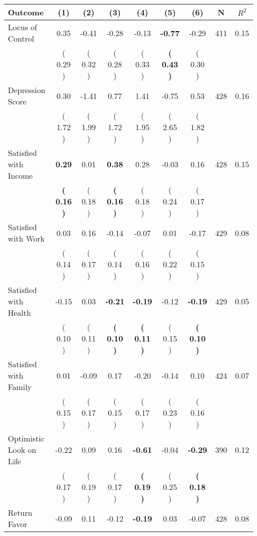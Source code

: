 \begin{tabular}{lcccccccc}
\toprule
 \textbf{Outcome} & \textbf{(1)} & \textbf{(2)} & \textbf{(3)} & \textbf{(4)} & \textbf{(5)} & \textbf{(6)} & \textbf{N} & \textbf{$ R^2$} \\
\midrule
Locus of Control &      0.35 &     -0.41 &     -0.28 &     -0.13 & \textbf{    -0.77} &     -0.29 & 411 &       0.15 \\ 
 & (     0.29 ) & (     0.32 ) & (     0.28 ) & (     0.33 ) & \textbf{(     0.43 )} & (     0.30 ) & \\
Depression Score &      0.30 &     -1.41 &      0.77 &      1.41 &     -0.75 &      0.53 & 428 &       0.16 \\ 
 & (     1.72 ) & (     1.99 ) & (     1.72 ) & (     1.95 ) & (     2.65 ) & (     1.82 ) & \\
Satisfied with Income & \textbf{     0.29} &      0.01 & \textbf{     0.38} &      0.28 &     -0.03 &      0.16 & 428 &       0.15 \\ 
 & \textbf{(     0.16 )} & (     0.18 ) & \textbf{(     0.16 )} & (     0.18 ) & (     0.24 ) & (     0.17 ) & \\
Satisfied with Work &      0.03 &      0.16 &     -0.14 &     -0.07 &      0.01 &     -0.17 & 429 &       0.08 \\ 
 & (     0.14 ) & (     0.17 ) & (     0.14 ) & (     0.16 ) & (     0.22 ) & (     0.15 ) & \\
Satisfied with Health &     -0.15 &      0.03 & \textbf{    -0.21} & \textbf{    -0.19} &     -0.12 & \textbf{    -0.19} & 429 &       0.05 \\ 
 & (     0.10 ) & (     0.11 ) & \textbf{(     0.10 )} & \textbf{(     0.11 )} & (     0.15 ) & \textbf{(     0.10 )} & \\
Satisfied with Family &      0.01 &     -0.09 &      0.17 &     -0.20 &     -0.14 &      0.10 & 424 &       0.07 \\ 
 & (     0.15 ) & (     0.17 ) & (     0.15 ) & (     0.17 ) & (     0.23 ) & (     0.16 ) & \\
Optimistic Look on Life &     -0.22 &      0.09 &      0.16 & \textbf{    -0.61} &     -0.04 & \textbf{    -0.29} & 390 &       0.12 \\ 
 & (     0.17 ) & (     0.19 ) & (     0.17 ) & \textbf{(     0.19 )} & (     0.25 ) & \textbf{(     0.18 )} & \\
Return Favor &     -0.09 &      0.11 &     -0.12 & \textbf{    -0.19} &      0.03 &     -0.07 & 428 &       0.08 \\ 

\end{tabular}
